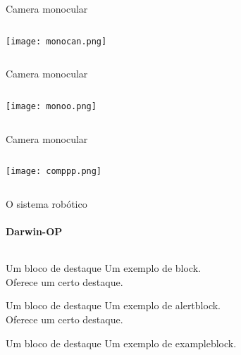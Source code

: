 \begin{frame}[t]{Camera monocular}
    \transboxout[duration=0.5]
    \begin{columns}
            \texttt{[image: monocan.png]}
    \end{columns}
\end{frame}
\begin{frame}[t]{Camera monocular}
    \transboxout[duration=0.5]
    \begin{columns}
            \texttt{[image: monoo.png]}
    \end{columns}
\end{frame}
\begin{frame}[t]{Camera monocular}
    \transboxout[duration=0.5]
    \begin{columns}
            \texttt{[image: comppp.png]}
    \end{columns}
\end{frame}
\begin{frame}[t]{O sistema robótico}
    \transboxout[duration=0.5]
    \framesubtitle{Darwin-OP}
    \begin{columns}
    \end{columns}

    \begin{block}{Um bloco de destaque}
        Um exemplo de block.\\
        Oferece um certo destaque.
    \end{block}

    \begin{alertblock}{Um bloco de destaque}
        Um exemplo de alertblock.\\
        Oferece um certo destaque.
    \end{alertblock}

    \begin{exampleblock}{Um bloco de destaque}
        Um exemplo de exampleblock.
    \end{exampleblock}
\end{frame}
